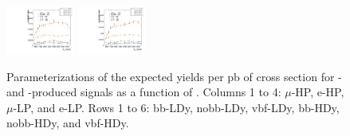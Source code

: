 \begin{figure}[htbp]
  \includegraphics[width=0.2\textwidth]{fig/2Dfit/paramSignalYield_NonVBFSig_mu_LP_vbf_HDy.pdf}
  \includegraphics[width=0.2\textwidth]{fig/2Dfit/paramSignalYield_NonVBFSig_e_LP_vbf_HDy.pdf}\\
  \caption{
    Parameterizations of the expected yields per pb of cross section for \ggF- and \DY-produced signals as a function of \MX.
    Columns 1 to 4: $\mu$-HP, e-HP, $\mu$-LP, and e-LP.
    Rows 1 to 6: bb-LDy, nobb-LDy, vbf-LDy, bb-HDy, nobb-HDy, and vbf-HDy.}
  \label{fig:YieldParam_NonVBF_Run2}
\end{figure}

